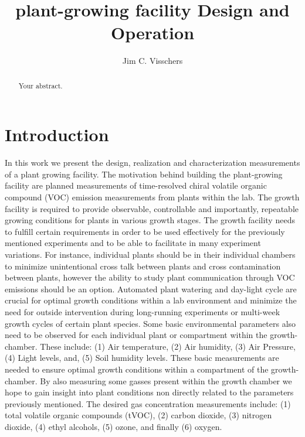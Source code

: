 \documentclass[reprint,superscriptaddress,aps,amsmath,amssymb]{revtex4-1}
\begin{document}
\title{plant-growing facility Design and Operation}
\author{Jim C. Visschers} 

\begin{abstract}
Your abstract.
\end{abstract}
\maketitle
\tableofcontents
\section{Introduction}
In this work we present the design, realization and characterization measurements of a plant growing facility. The motivation behind building the plant-growing facility are planned measurements of time-resolved chiral volatile organic compound (VOC) emission measurements from plants within the lab. The growth facility is required to provide observable, controllable and importantly, repeatable growing conditions for plants in various growth stages. 
The growth facility needs to fulfill certain requirements in order to be used effectively for the previously mentioned experiments and to be able to facilitate in many experiment variations. For instance, individual plants should be in their individual chambers to minimize unintentional cross talk between plants and cross contamination between plants, however the ability to study plant communication through VOC emissions should be an option. Automated plant watering and day-light cycle are crucial for optimal growth conditions within a lab environment and minimize the need for outside intervention during long-running experiments or multi-week growth cycles of certain plant species. 
Some basic environmental parameters also need to be observed for each individual plant or compartment within the growth-chamber. These include: (1) Air temperature, (2) Air humidity, (3) Air Pressure, (4) Light levels, and, (5) Soil humidity levels. These basic measurements are needed to ensure optimal growth conditions within a compartment of the growth-chamber. By also measuring some gasses present within the growth chamber we hope to gain insight into plant conditions non directly related to the parameters previously mentioned. The desired gas concentration measurements include: (1) total volatile organic compounds (tVOC), (2) carbon dioxide, (3) nitrogen dioxide, (4) ethyl alcohols, (5) ozone, and finally (6) oxygen.
\end{document}
